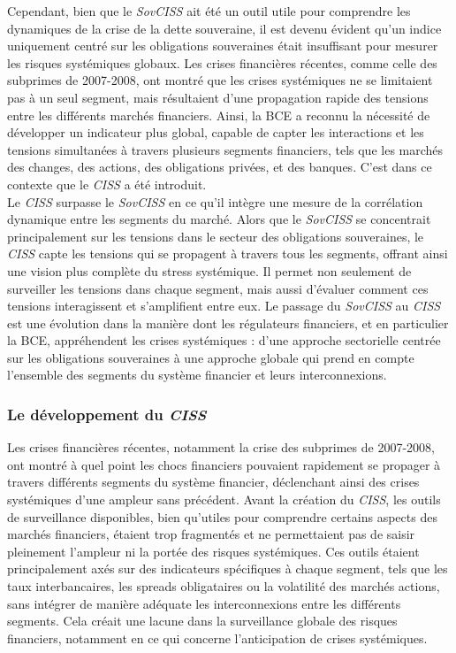 \begin{sloppypar}
Cependant, bien que le \textit{SovCISS} ait été un outil utile pour comprendre les dynamiques de la crise de la dette souveraine, il est devenu évident qu'un indice uniquement centré sur les obligations souveraines était insuffisant pour mesurer les risques systémiques globaux. Les crises financières récentes, comme celle des subprimes de 2007-2008, ont montré que les crises systémiques ne se limitaient pas à un seul segment, mais résultaient d'une propagation rapide des tensions entre les différents marchés financiers. Ainsi, la BCE a reconnu la nécessité de développer un indicateur plus global, capable de capter les interactions et les tensions simultanées à travers plusieurs segments financiers, tels que les marchés des changes, des actions, des obligations privées, et des banques. C’est dans ce contexte que le \textit{CISS} a été introduit.\\

Le \textit{CISS} surpasse le \textit{SovCISS} en ce qu’il intègre une mesure de la corrélation dynamique entre les segments du marché. Alors que le \textit{SovCISS} se concentrait principalement sur les tensions dans le secteur des obligations souveraines, le \textit{CISS} capte les tensions qui se propagent à travers tous les segments, offrant ainsi une vision plus complète du stress systémique. Il permet non seulement de surveiller les tensions dans chaque segment, mais aussi d’évaluer comment ces tensions interagissent et s’amplifient entre eux. Le passage du \textit{SovCISS} au \textit{CISS} est une évolution dans la manière dont les régulateurs financiers, et en particulier la BCE, appréhendent les crises systémiques : d’une approche sectorielle centrée sur les obligations souveraines à une approche globale qui prend en compte l'ensemble des segments du système financier et leurs interconnexions.

\subsubsection{Le développement du \textit{CISS}}

Les crises financières récentes, notamment la crise des subprimes de 2007-2008, ont montré à quel point les chocs financiers pouvaient rapidement se propager à travers différents segments du système financier, déclenchant ainsi des crises systémiques d’une ampleur sans précédent. Avant la création du \textit{CISS}, les outils de surveillance disponibles, bien qu'utiles pour comprendre certains aspects des marchés financiers, étaient trop fragmentés et ne permettaient pas de saisir pleinement l'ampleur ni la portée des risques systémiques. Ces outils étaient principalement axés sur des indicateurs spécifiques à chaque segment, tels que les taux interbancaires, les spreads obligataires ou la volatilité des marchés actions, sans intégrer de manière adéquate les interconnexions entre les différents segments. Cela créait une lacune dans la surveillance globale des risques financiers, notamment en ce qui concerne l’anticipation de crises systémiques.\\


\end{sloppypar}
